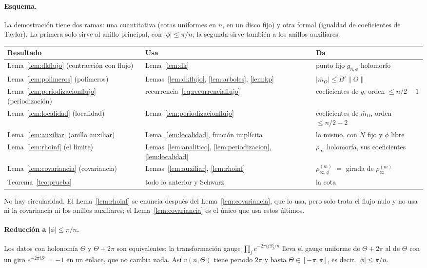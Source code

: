 \documentclass[11pt,a4paper]{article}
\theoremstyle{remark}
\begin{document}
\paragraph{Esquema.} La demostración tiene dos ramas: una cuantitativa (cotas uniformes en $n$, en un
disco fijo) y otra formal (igualdad de coeficientes de Taylor). La primera solo sirve al anillo
principal, con $|\phi|\le\pi/n$; la segunda sirve también a los anillos auxiliares.
\begin{center}\small
\begin{tabular}{lll}
\toprule
Resultado & Usa & Da\\
\midrule
Lema~\ref{lem:dkflujo} (contracción con flujo) & Lema~\ref{lem:dk} & punto fijo $g_{n,\phi}$ holomorfo\\
Lema~\ref{lem:polimeros} (polímeros) & Lemas~\ref{lem:dkflujo}, \ref{lem:arboles}, \ref{lem:kp} & $|\bar m_O|\le B'\|O\|$\\
Lema~\ref{lem:periodizacionflujo} (periodización) & recurrencia~\eqref{eq:recurrenciaflujo} & coeficientes de $g$, orden $\le n/2-1$\\
Lema~\ref{lem:localidad} (localidad) & Lema~\ref{lem:periodizacionflujo} & coeficientes de $\bar m_O$, orden $\le n/2-2$\\
Lema~\ref{lem:auxiliar} (anillo auxiliar) & Lema~\ref{lem:localidad}, función implícita & lo mismo, con $N$ fijo y $\phi$ libre\\
Lema~\ref{lem:rhoinf} (el límite) & Lemas~\ref{lem:analitico}, \ref{lem:periodizacion}, \ref{lem:localidad} & $\rho_\infty$ holomorfa, sus coeficientes\\
Lema~\ref{lem:covariancia} (covariancia) & Lemas~\ref{lem:auxiliar}, \ref{lem:rhoinf} & $\rho^{(m)}_{\infty,\phi}$ $=$ girada de $\rho^{(m)}_\infty$\\
Teorema~\ref{teo:prueba} & todo lo anterior y Schwarz & la cota\\
\bottomrule
\end{tabular}
\end{center}
No hay circularidad. El Lema~\ref{lem:rhoinf} se enuncia después del Lema~\ref{lem:covariancia}, que lo
usa, pero solo trata el flujo nulo y no usa ni la covariancia ni los anillos auxiliares; el
Lema~\ref{lem:covariancia} es el único que usa estos últimos.

\paragraph{Reducción a $|\phi|\le\pi/n$.} Los datos con holonomía $\Theta$ y $\Theta+2\pi$ son
equivalentes: la transformación gauge $\prod_je^{-2\pi ijS^z_j/n}$ lleva el gauge uniforme de
$\Theta+2\pi$ al de $\Theta$ con un giro $e^{-2\pi iS^z}=-1$ en un enlace, que no cambia nada. Así
$v(n,\Theta)$ tiene periodo $2\pi$ y basta $\Theta\in[-\pi,\pi]$, es decir, $|\phi|\le\pi/n$.
\end{document}
